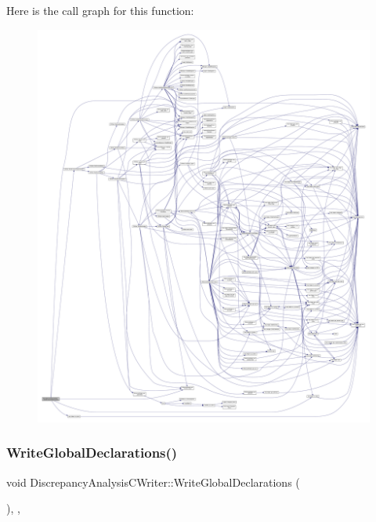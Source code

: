 Here is the call graph for this function\+:
\nopagebreak
\begin{figure}[H]
\begin{center}
\leavevmode
\includegraphics[width=350pt]{d4/d5c/classDiscrepancyAnalysisCWriter_a544a8f99622f86cfbcc2eae9a83d4e64_cgraph}
\end{center}
\end{figure}
\mbox{\label{classDiscrepancyAnalysisCWriter_a33b017d849ad5c03561e0bd2a72a37a9}} 
\subsubsection{\texorpdfstring{Write\+Global\+Declarations()}{WriteGlobalDeclarations()}}
{\footnotesize\ttfamily void Discrepancy\+Analysis\+C\+Writer\+::\+Write\+Global\+Declarations (\begin{DoxyParamCaption}{ }\end{DoxyParamCaption})\hspace{0.3cm}{\ttfamily [override]}, {\ttfamily [protected]}, {\ttfamily [virtual]}}



